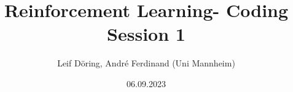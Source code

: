 \documentclass[10pt, aspectratio=169, hyperref={colorlinks = true,linkcolor = blue}]{beamer}
\title{Reinforcement Learning- Coding Session 1}
\subtitle{Leif D\"oring, Andr\'e Ferdinand (Uni Mannheim)}
\date{06.09.2023}
\begin{document}
	\maketitle
	\tableofcontents
	\makeatother
	
	
	
	
\end{document}
